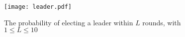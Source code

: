    \begin{figure}[h]
      \centering
      \texttt{[image: leader.pdf]}	
      \caption{The probability of electing a leader within $L$ rounds, with $1 \leq L \leq 10$}
      \label{leader-res}
      \end{figure}
\begin{comment}
\subsection{Problems}
\label{sec:problems}
While testing our choreographic language, we noticed that some of the case studies presented in the 
PRISM documentation \cite{PRISMdoc} cannot be modeled by using our language.
The reasons are various, in this section we try to outline the problems.

\begin{itemize}
\item \textbf{Asynchronous Leader Election}\footnote{\url{https://www.prismmodelchecker.org/casestudies/asynchronous_leader.php}}:
 processes synchronize with the same label but the conditions are different.
 We include in our language the \texttt{it-then-else} statement but we do not allow 
 the \texttt{if-then} (without the \texttt{else}). This is done because in this way, we do not 
 incur in deadlock states.
\item  \textbf{Probabilistic Broadcast Protocols}\footnote{\url{https://www.prismmodelchecker.org/casestudies/prob_broadcast.php}}:
 also in this case, the problem are the labels of the synchronizations.
 In fact, all the processes synchornize with the same label on every actions.
 This is not possible in our language, since a label is unique for every synchronization between two (or more) processes.
\item \textbf{Cyclic Server Polling System}\footnote{\url{https://www.prismmodelchecker.org/casestudies/polling.php}}:
 in this model, the processes \texttt{station$_i$} do two different things in the same state.
 More precicely, at the state 0 (\texttt{s$_i$=0}), the processes may synchornize with the process
 \texttt{server} or may change their state without any synchronization.
 In out language, this cannot be formalized since the synchronization is a branch action,
 so there should be another option with a synchronization.


\end{itemize}
\end{comment}


